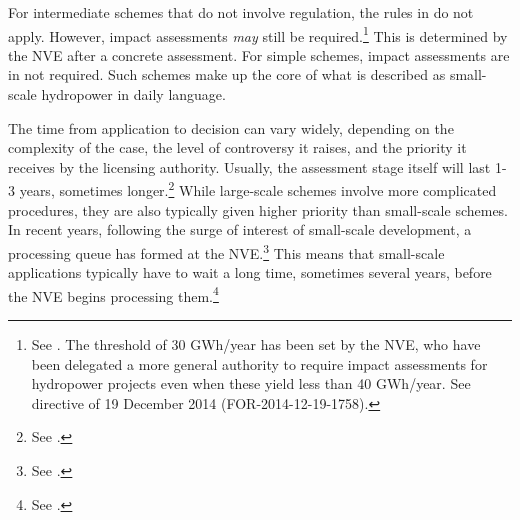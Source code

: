 For intermediate schemes that do not involve regulation, the rules in \cite{wra17} do not apply. However, impact assessments {\it may} still be required.\footnote{See \cite[20]{stokker10}. The threshold of 30 GWh/year has been set by the NVE, who have been delegated a more general authority to require impact assessments for hydropower projects even when these yield less than 40 GWh/year. See directive of 19 December 2014 (FOR-2014-12-19-1758).} This is determined by the NVE after a concrete assessment. For simple schemes, impact assessments are in not required. Such schemes make up the core of what is described as small-scale hydropower in daily language.

The time from application to decision can vary widely, depending on the complexity of the case, the level of controversy it raises, and the priority it receives by the licensing authority. Usually, the assessment stage itself will last 1-3 years, sometimes longer.\footnote{See \cite[84-85]{nou129}.} While large-scale schemes involve more complicated procedures, they are also typically given higher priority than small-scale schemes. In recent years, following the surge of interest of small-scale development, a processing queue has formed at the NVE.\footnote{See \cite[84]{nou129}.} This means that small-scale applications typically have to wait a long time, sometimes several years, before the NVE begins processing them.\footnote{See \cite[84]{nou129}.}

